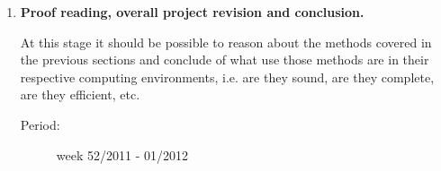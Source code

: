 \begin{enumerate}
\begin{description}
\end{description}

\item {\bf Proof reading, overall project revision and conclusion.}

At this stage it should be possible to reason about the methods covered in the 
previous sections and conclude of what use those methods are in their 
respective computing environments, i.e. are they sound, are they complete, are 
they efficient, etc.

\begin{description}

\item [Period:] week 52/2011 - 01/2012

\end{description}

\end{enumerate}
